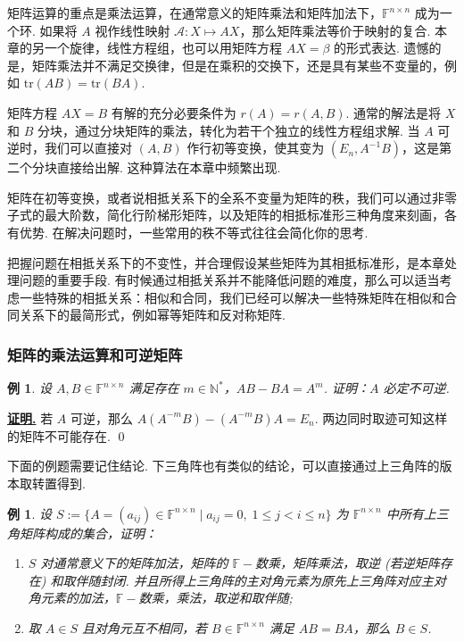\documentclass[10pt,openany]{article}
\theoremstyle{thmstyle} %
\theoremstyle{defstyle} %
\theoremstyle{prostyle} %
\theoremstyle{exastyle}
\newtheorem{example}[theorem]{例}
\theoremstyle{remstyle}
\renewenvironment{proof}[1][证明]{\par\underline{\textbf{#1.}} \;\fangsong}{\qed\par}
\newcommand{\F}{\mathbb{F}}
\newcommand{\n}{^{n \times n}}
\newcommand{\tr}{\mathrm{tr}}
\begin{document}
矩阵运算的重点是乘法运算，在通常意义的矩阵乘法和矩阵加法下，\( \F\n \) 成为一个环. 如果将 \( A \) 视作线性映射 \( \mathscr{A}: X \mapsto AX \)，那么矩阵乘法等价于映射的复合. 本章的另一个旋律，线性方程组，也可以用矩阵方程 \( AX=\beta \) 的形式表达. 遗憾的是，矩阵乘法并不满足交换律，但是在乘积的交换下，还是具有某些不变量的，例如 \( \tr(AB)=\tr(BA) \).

矩阵方程 \( AX=B \) 有解的充分必要条件为 \( r(A)=r(A,B) \). 通常的解法是将 \( X \) 和 \( B \) 分块，通过分块矩阵的乘法，转化为若干个独立的线性方程组求解. 当 \( A \) 可逆时，我们可以直接对 \( (A,B) \) 作行初等变换，使其变为 \( (E_n,A^{-1}B) \)，这是第二个分块直接给出解. 这种算法在本章中频繁出现.

矩阵在初等变换，或者说相抵关系下的全系不变量为矩阵的秩，我们可以通过非零子式的最大阶数，简化行阶梯形矩阵，以及矩阵的相抵标准形三种角度来刻画，各有优势. 在解决问题时，一些常用的秩不等式往往会简化你的思考.

把握问题在相抵关系下的不变性，并合理假设某些矩阵为其相抵标准形，是本章处理问题的重要手段. 有时候通过相抵关系并不能降低问题的难度，那么可以适当考虑一些特殊的相抵关系：相似和合同，我们已经可以解决一些特殊矩阵在相似和合同关系下的最简形式，例如幂等矩阵和反对称矩阵.

\subsubsection{矩阵的乘法运算和可逆矩阵}

\begin{example}
	设 \( A,B \in \F\n \) 满足存在 \( m \in \mathbb{N}^* \)，\( AB-BA=A^m \). 证明：\( A \) 必定不可逆.
\end{example}

\begin{proof}
	若 \( A \) 可逆，那么 \( A(A^{-m}B)-(A^{-m}B)A=E_n \). 两边同时取迹可知这样的矩阵不可能存在.
\end{proof}


下面的例题需要记住结论. 下三角阵也有类似的结论，可以直接通过上三角阵的版本取转置得到.

\begin{example} \label{4.2.2}
	设 \( S:=\{ A=(a_{ij}) \in \F\n \mid a_{ij}=0, \; 1 \leq j<i \leq n\} \) 为 \( \F\n \) 中所有上三角矩阵构成的集合，证明：
	\begin{enumerate}[(1)]
		\item \( S \) 对通常意义下的矩阵加法，矩阵的 \( \F-\)数乘，矩阵乘法，取逆 (若逆矩阵存在) 和取伴随封闭. 并且所得上三角阵的主对角元素为原先上三角阵对应主对角元素的加法，\( \F-\)数乘，乘法，取逆和取伴随;
		\item 取 \( A \in S \) 且对角元互不相同，若 \( B \in \F\n \) 满足 \( AB=BA \)，那么 \( B \in S \).
	\end{enumerate}
\end{example}
\end{document}
